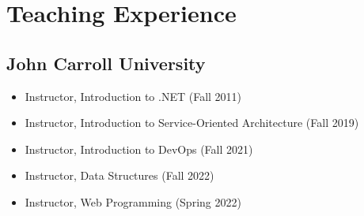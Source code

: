 \documentclass{cv_style}
\begin{document}
		
	\section{Teaching Experience}
		\subsection{John Carroll University}
		\begin{itemize}
			\item Instructor, Introduction to .NET (Fall 2011)
			\item Instructor, Introduction to Service-Oriented Architecture (Fall 2019)
			\item Instructor, Introduction to DevOps (Fall 2021)
			\item Instructor, Data Structures (Fall 2022)
			\item Instructor, Web Programming (Spring 2022)
		\end{itemize}
		
		
\end{document}
